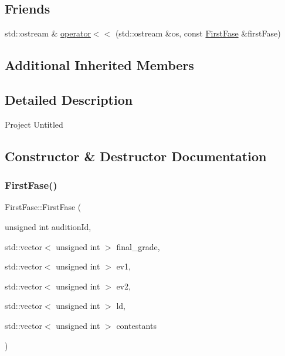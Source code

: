 \subsection*{Friends}
\begin{DoxyCompactItemize}
\item 
std\+::ostream \& \hyperlink{class_first_fase_add1bd2f2c37acd8771e4c58a6e2923fd}{operator$<$$<$} (std\+::ostream \&os, const \hyperlink{class_first_fase}{First\+Fase} \&first\+Fase)
\end{DoxyCompactItemize}
\subsection*{Additional Inherited Members}


\subsection{Detailed Description}
Project Untitled 

\subsection{Constructor \& Destructor Documentation}
\mbox{\label{class_first_fase_a9b46c60a282c00766e0a13c097cc1813}} 
\subsubsection{\texorpdfstring{First\+Fase()}{FirstFase()}\hspace{0.1cm}{\footnotesize\ttfamily [1/2]}}
{\footnotesize\ttfamily First\+Fase\+::\+First\+Fase (\begin{DoxyParamCaption}\item[{unsigned int}]{audition\+Id,  }\item[{std\+::vector$<$ unsigned int $>$}]{final\+\_\+grade,  }\item[{std\+::vector$<$ unsigned int $>$}]{ev1,  }\item[{std\+::vector$<$ unsigned int $>$}]{ev2,  }\item[{std\+::vector$<$ unsigned int $>$}]{ld,  }\item[{std\+::vector$<$ unsigned int $>$}]{contestants }\end{DoxyParamCaption})}



